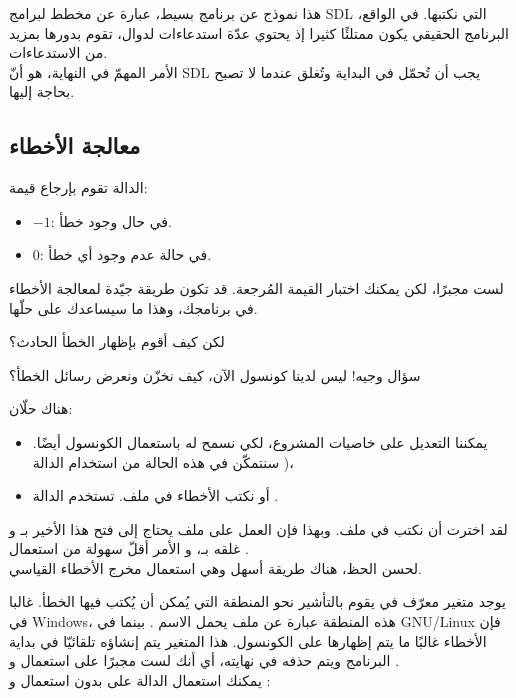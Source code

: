 هذا نموذج عن برنامج بسيط، عبارة عن مخطط لبرامج
\textenglish{SDL}
التي نكتبها. في الواقع، البرنامج الحقيقي يكون ممتلئًا كثيرا إذ يحتوي عدّة استدعاءات لدوال، تقوم بدورها بمزيد من الاستدعاءات.\\
الأمر المهمّ في النهاية، هو أنّ
\textenglish{SDL}
يجب أن تُحمّل في البداية وتُغلق عندما لا تصبح بحاجة إليها.

\subsection{معالجة الأخطاء}

الدالة 
تقوم بإرجاع قيمة:

\begin{itemize}
	\item $ -1 $: في حال وجود خطأ.
	\item $ 0 $: في حالة عدم وجود أي خطأ.
\end{itemize}

لست مجبرًا، لكن يمكنك اختبار القيمة المُرجعة. قد تكون طريقة جيّدة لمعالجة الأخطاء في برنامجك، وهذا ما سيساعدك على حلّها.

\begin{question}
لكن كيف أقوم بإظهار الخطأ الحادث؟
\end{question}

سؤال وجيه! ليس لدينا كونسول الآن، كيف نخزّن ونعرض رسائل الخطأ؟

هناك حلّان:
\begin{itemize}
	\item يمكننا التعديل على خاصيات المشروع، لكي نسمح له باستعمال الكونسول أيضًا. سنتمكّن في هذه الحالة من استخدام الدالة 
	)،
	\item أو نكتب الأخطاء في ملف. تستخدم الدالة
	.
\end{itemize}

لقد اخترت أن نكتب في ملف. وبهذا فإن العمل على ملف يحتاج إلى فتح هذا الأخير بـ
و غلقه بـ،
و الأمر أقلّ سهولة من استعمال .\\
لحسن الحظ، هناك طريقة أسهل وهي استعمال مخرج الأخطاء القياسي.

يوجد متغير 
معرّف في 
يقوم بالتأشير نحو المنطقة التي يُمكن أن يُكتب فيها الخطأ. غالبا في 
\textenglish{Windows}،
 هذه المنطقة عبارة عن ملف يحمل الاسم 
.
بينما في 
\textenglish{GNU/Linux}
فإن الأخطاء غالبًا ما يتم إظهارها على الكونسول. هذا المتغير يتم إنشاؤه تلقائيّا في بداية البرنامج ويتم حذفه في نهايته، أي أنك لست مجبرًا على استعمال 
و
.\\
يمكنك استعمال الدالة
على 
بدون استعمال  
و 
:

